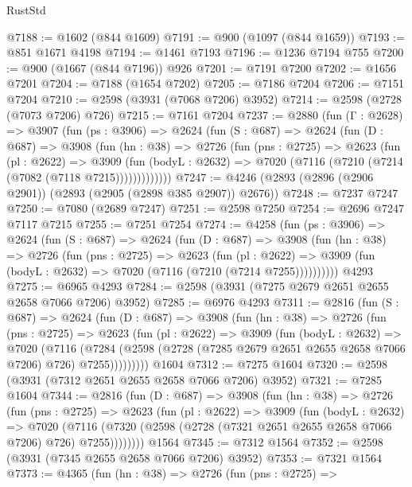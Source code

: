 \begin{lexlean}{RustStd}
\begin{coremodule}
@7188 := @1602 (@844 @1609)
@7191 := @900 (@1097 (@844 @1659))
@7193 := @851 @1671 @4198
@7194 := @1461 @7193
@7196 := @1236 @7194 @755
@7200 := @900 (@1667 (@844 @7196)) @926
@7201 := @7191 @7200
@7202 := @1656 @7201
@7204 := @7188 (@1654 @7202)
@7205 := @7186 @7204
@7206 := @7151 @7204
@7210 := @2598 (@3931 (@7068 @7206) @3952)
@7214 := @2598 (@2728 (@7073 @7206) @726)
@7215 := @7161 @7204
@7237 := @2880
    (fun (Γ : @2628) =>
    @3907
      (fun (ps : @3906) =>
      @2624
        (fun (S : @687) =>
        @2624
          (fun (D : @687) =>
          @3908
            (fun (hn : @38) =>
            @2726
              (fun (pns : @2725) =>
              @2623
                (fun (pl : @2622) =>
                @3909
                  (fun (bodyL : @2632) =>
                  @7020 (@7116 (@7210 (@7214 (@7082 (@7118 @7215)))))))))))))
@7247 := @4246 (@2893 (@2896 (@2906 @2901)) (@2893 (@2905 (@2898 @385 @2907)) @2676))
@7248 := @7237 @7247
@7250 := @7080 (@2689 @7247)
@7251 := @2598 @7250
@7254 := @2696 @7247 @7117 @7215
@7255 := @7251 @7254
@7274 := @4258
    (fun (ps : @3906) =>
    @2624
      (fun (S : @687) =>
      @2624
        (fun (D : @687) =>
        @3908
          (fun (hn : @38) =>
          @2726
            (fun (pns : @2725) =>
            @2623
              (fun (pl : @2622) =>
              @3909 (fun (bodyL : @2632) => @7020 (@7116 (@7210 (@7214 @7255))))))))))
    @4293
@7275 := @6965 @4293
@7284 := @2598 (@3931 (@7275 @2679 @2651 @2655 @2658 @7066 @7206) @3952)
@7285 := @6976 @4293
@7311 := @2816
    (fun (S : @687) =>
    @2624
      (fun (D : @687) =>
      @3908
        (fun (hn : @38) =>
        @2726
          (fun (pns : @2725) =>
          @2623
            (fun (pl : @2622) =>
            @3909
              (fun (bodyL : @2632) =>
              @7020
                (@7116
                  (@7284
                    (@2598 (@2728 (@7285 @2679 @2651 @2655 @2658 @7066 @7206) @726) @7255)))))))))
    @1604
@7312 := @7275 @1604
@7320 := @2598 (@3931 (@7312 @2651 @2655 @2658 @7066 @7206) @3952)
@7321 := @7285 @1604
@7344 := @2816
    (fun (D : @687) =>
    @3908
      (fun (hn : @38) =>
      @2726
        (fun (pns : @2725) =>
        @2623
          (fun (pl : @2622) =>
          @3909
            (fun (bodyL : @2632) =>
            @7020
              (@7116 (@7320 (@2598 (@2728 (@7321 @2651 @2655 @2658 @7066 @7206) @726) @7255))))))))
    @1564
@7345 := @7312 @1564
@7352 := @2598 (@3931 (@7345 @2655 @2658 @7066 @7206) @3952)
@7353 := @7321 @1564
@7373 := @4365
    (fun (hn : @38) =>
    @2726
      (fun (pns : @2725) =>

\end{coremodule}
\end{lexlean}
